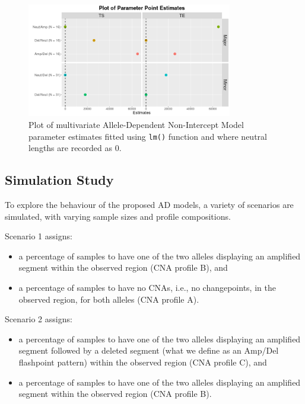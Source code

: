 \begin{figure}[H]  
\centering
\includegraphics[width = 0.8\textwidth]{../figures/Chapter_5/Multivariate_lm_6_AD_Interval.png}
 
\caption[Plot of multivariate Allele-Dependent Non-Intercept Model parameter estimates fitted using \texttt{lm()} function.]{Plot of multivariate Allele-Dependent Non-Intercept Model parameter estimates fitted using \texttt{lm()} function and where neutral lengths are recorded as 0.}
\label{fig:lm_multi_AD_modpred_6}
\end{figure} 

\subsection{Simulation Study}
To explore the behaviour of the proposed AD models, a variety of scenarios are simulated, with varying sample sizes and profile compositions.
\newline

Scenario 1 assigns:
\begin{itemize}
\item a percentage of samples to have one of the two alleles displaying an amplified segment within the observed region (CNA profile B), and 
\item a percentage of samples to  have no CNAs, i.e., no changepoints, in the observed region, for both alleles (CNA profile A). 
\end{itemize}

Scenario 2 assigns:
\begin{itemize}
\item a percentage of samples to have one of the two alleles displaying an amplified segment followed by a deleted segment (what we define as an Amp/Del flashpoint pattern) within the observed region (CNA profile C), and 
\item a percentage of samples to have one of the two alleles displaying an amplified segment within the observed region (CNA profile B).
\end{itemize}


